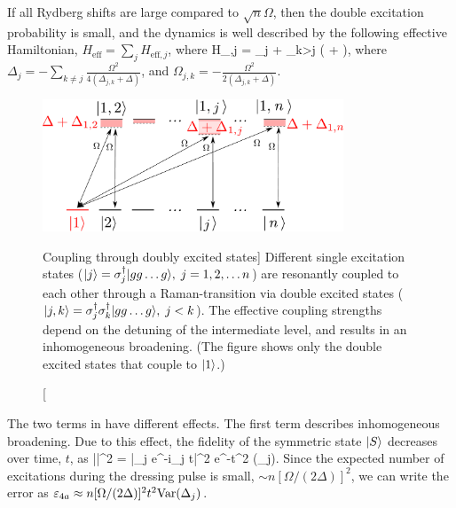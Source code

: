 If all Rydberg shifts are large compared to
$\sqrt{n}\Omega$, then the double excitation probability is small, and the
dynamics is well described by the following effective Hamiltonian, $H_\mathrm{eff} = \sum_j
H_{\mathrm{eff}, j}$, where 
\bel
\label{eq:H_eff}
	H_{,j} = \Delta_j  + \sum_{k>j}
	 \big(  +  \big),
\eel
where $\Delta_j = -\sum_{k\neq j}\frac{\Omega^2}{4(\Delta_{j,k} + \Delta)}$, and    
$\Omega_{j,k} = -\frac{\Omega^2}{2(\Delta_{j,k} + \Delta)}$.
\begin{figure}[h]
\centering
\includegraphics[width=0.80\textwidth]
{./figs_Komar2015/coupling_1_2_smalln_only1.pdf} 
\caption
[Coupling through doubly excited states]
{
\label{fig:coupling 1,2}   
Different single excitation states ($| j \rangle = \sigma_j^\dagger | gg\dots g \rangle, \; j
= 1,2,\dots n$) are resonantly coupled to each other through a Raman-transition
via double excited states ($| j,k \rangle = \sigma_j^\dagger\sigma_k^\dagger| gg\dots g \rangle,\;
j < k$). The effective coupling strengths depend on the detuning of the
intermediate level, and results in an inhomogeneous broadening. (The figure
shows only the double excited states that couple to $| 1 \rangle$.)}
\end{figure}

The two terms in  have different effects. The first
term describes inhomogeneous broadening. Due to this effect, the fidelity of the
symmetric state $| S \rangle$ decreases over time, $t$, as
\bel
	\left|\right|^2 = \left|\sum_j
	e^{-i\Delta_j t}\right|^2 \approx e^{-t^2 (\Delta_j)}.
\eel
Since the expected number of excitations during the dressing pulse is small,
$\sim n[\Omega/(2\Delta)]^2$, we can write the error as $\varepsilon_{4a} \approx
n[\Omega/(2\Delta)]^2 t^2 \mathrm{Var}(\Delta_j)$.


